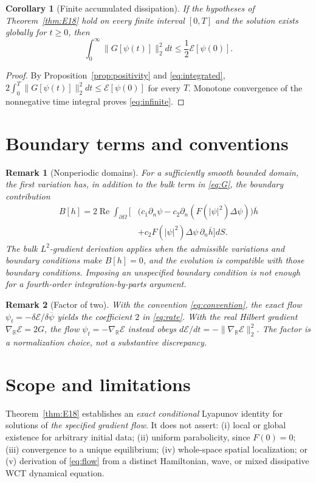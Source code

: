 \documentclass[11pt]{article}
\newtheorem{corollary}{Corollary}
\newtheorem{remark}{Remark}
\newcommand{\Om}{\Omega}
\newcommand{\EE}{\mathcal E}
\newcommand{\RR}{\mathbb R}
\newcommand{\Rea}{\operatorname{Re}}
\begin{document}
\begin{corollary}[Finite accumulated dissipation]
If the hypotheses of Theorem~\ref{thm:E18} hold on every finite
interval $[0,T]$ and the solution exists globally for $t\ge0$, then
\begin{equation}\label{eq:infinite}
 \int_0^\infty\|G[\psi(t)]\|_2^2dt
 \le\frac12\EE[\psi(0)].
\end{equation}
\end{corollary}
\begin{proof}
By Proposition~\ref{prop:positivity} and \eqref{eq:integrated},
$2\int_0^T\|G[\psi(t)]\|_2^2dt\le\EE[\psi(0)]$ for every $T$.
Monotone convergence of the nonnegative time integral proves
\eqref{eq:infinite}.
\end{proof}

\section{Boundary terms and conventions}
\begin{remark}[Nonperiodic domains]
For a sufficiently smooth bounded domain, the first variation has,
in addition to the bulk term in \eqref{eq:G}, the boundary contribution
\begin{equation}\label{eq:boundary}
 \begin{split}
 B[h]=2\Rea\int_{\partial\Om}\bigl[&
 \bigl(c_1\partial_n\psi-c_2\partial_n(F(|\psi|^2)\Delta\psi)\bigr)
 \overline h\\
 &+c_2F(|\psi|^2)\Delta\psi\,\partial_n\overline h
 \bigr]dS.
 \end{split}
\end{equation}
The bulk $L^2$-gradient derivation applies when the admissible variations
and boundary conditions make $B[h]=0$, and the evolution is compatible
with those boundary conditions.  Imposing an unspecified boundary condition
is not enough for a fourth-order integration-by-parts argument.
\end{remark}

\begin{remark}[Factor of two]
With the convention \eqref{eq:convention}, the exact flow
$\psi_t=-\delta\EE/\delta\overline\psi$ yields the coefficient $2$
in \eqref{eq:rate}.  With the real Hilbert gradient
$\nabla_\RR\EE=2G$, the flow $\psi_t=-\nabla_\RR\EE$ instead obeys
$d\EE/dt=-\|\nabla_\RR\EE\|_2^2$.
The factor is a normalization choice, not a substantive discrepancy.
\end{remark}

\section{Scope and limitations}
Theorem~\ref{thm:E18} establishes an \emph{exact conditional}
Lyapunov identity for solutions of \emph{the specified gradient flow}.
It does not assert: (i) local or global existence for arbitrary initial
data; (ii) uniform parabolicity, since $F(0)=0$; (iii) convergence
to a unique equilibrium; (iv) whole-space spatial localization;
or (v) derivation of \eqref{eq:flow} from a distinct Hamiltonian,
wave, or mixed dissipative WCT dynamical equation.
\end{document}
